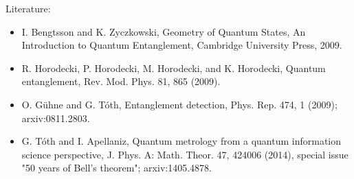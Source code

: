 \documentclass[11pt, oneside]{article}   	%
\begin{document}
Literature:

\begin{itemize}

\item I. Bengtsson and K. Zyczkowski, Geometry of Quantum States, An Introduction to Quantum Entanglement, Cambridge University Press, 2009. 

\item R. Horodecki, P. Horodecki, M. Horodecki, and K. Horodecki, Quantum entanglement, Rev. Mod. Phys. 81, 865 (2009).

\item O. Gühne and G. Tóth, Entanglement detection, Phys. Rep. 474, 1 (2009); arxiv:0811.2803.

\item G. Tóth and I. Apellaniz, Quantum metrology from a quantum information science perspective, J. Phys. A: Math. Theor. 47, 424006 (2014), special issue "50 years of Bell's theorem"; arxiv:1405.4878.

\end{itemize}
\end{document}
